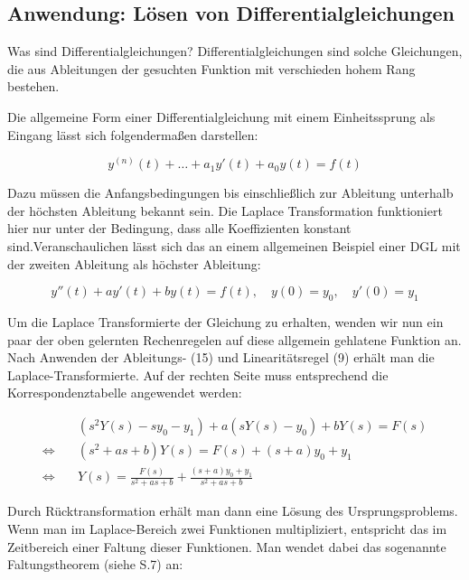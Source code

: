 \addvspace{1cm}
\subsection{Anwendung: Lösen von Differentialgleichungen}

Was sind Differentialgleichungen? Differentialgleichungen sind solche Gleichungen, die aus Ableitungen der gesuchten Funktion mit verschieden hohem Rang bestehen. 

Die allgemeine Form einer Differentialgleichung mit einem Einheitssprung als Eingang lässt sich folgendermaßen darstellen:

\begin{equation}
  y^{(n)}(t) + \dots + a_1 y'(t) + a_0 y(t) = f(t)
\end{equation}

Dazu müssen die Anfangsbedingungen bis einschließlich zur Ableitung unterhalb der höchsten Ableitung bekannt sein. Die Laplace Transformation funktioniert hier nur unter der Bedingung, dass alle Koeffizienten konstant sind.Veranschaulichen lässt sich das an einem allgemeinen Beispiel einer DGL mit der zweiten Ableitung als höchster Ableitung:

\begin{equation}
y''(t) + a y'(t) + b y(t) = f(t), \quad y(0) = y_0, \quad y'(0) = y_1
\label{eq:dgl_grundform}
\end{equation}

Um die Laplace Transformierte der Gleichung zu erhalten, wenden wir nun ein paar der oben gelernten Rechenregelen auf diese allgemein gehlatene Funktion an. Nach Anwenden der Ableitungs- (15) und Linearitätsregel (9) erhält man die Laplace-Transformierte. Auf der rechten Seite muss entsprechend die Korrespondenztabelle angewendet werden:

\begin{align*}
& \left( s^2 Y(s) - s y_0 - y_1 \right)
+ a \left( s Y(s) - y_0 \right)
+ b Y(s) = F(s) \\
\Leftrightarrow \quad
& \left( s^2 + a s + b \right) Y(s) = F(s) + (s + a) y_0 + y_1 \\
\Leftrightarrow \quad
& Y(s) = \frac{F(s)}{s^2 + a s + b} + \frac{(s + a)y_0 + y_1}{s^2 + a s + b}
\end{align*}
\cite[S.~886]{buch1}

Durch Rücktransformation erhält man dann eine Lösung des Ursprungsproblems. Wenn man im Laplace-Bereich zwei Funktionen multipliziert, entspricht das im Zeitbereich einer Faltung dieser Funktionen. Man wendet dabei das sogenannte Faltungstheorem (siehe S.7) an:

